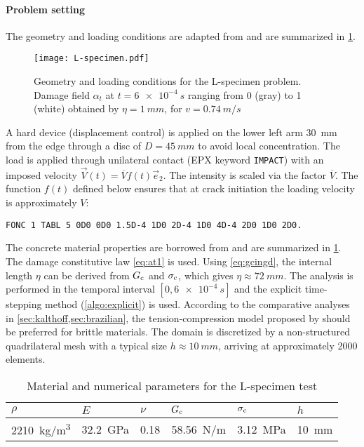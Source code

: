 \paragraph{Problem setting}
The geometry and loading conditions are adapted from \cite{OzboltBedeSharmaMayer:2015} and are summarized in \cref{fig:L-specimen}.
\begin{figure}[htbp]
\centering
\texttt{[image: L-specimen.pdf]}
\caption{Geometry and loading conditions for the L-specimen problem. Damage field $\alpha_t$ at $t=\SI{6e-4}{s}$ ranging from 0 (gray) to 1 (white) obtained by $\eta=\SI{1}{mm}$, for $v=\SI{0.74}{m/s}$} \label{fig:L-specimen}
\end{figure}
A hard device (displacement control) is applied on the lower left arm \SI{30}{mm} from the edge through a disc of $D=\SI{45}{mm}$ to avoid local concentration. The load is applied through unilateral contact (EPX keyword \texttt{IMPACT}) with an imposed velocity $\vec{V}(t)=\overline{V}f(t)\vec{e}_2$. The intensity is scaled via the factor $\overline{V}$. The function $f(t)$ defined below ensures that at crack initiation the loading velocity is approximately $V$:
\begin{lstlisting}
FONC 1 TABL 5 0D0 0D0 1.5D-4 1D0 2D-4 1D0 4D-4 2D0 1D0 2D0.
\end{lstlisting}
The concrete material properties are borrowed from \cite{OzboltBedeSharmaMayer:2015} and are summarized in \cref{tab:L}. The damage constitutive law \eqref{eq:at1} is used. Using \eqref{eq:gcingd}, the internal length $\eta$ can be derived from $G_\mathrm{c}$ and $\sigma_{\mathrm{c}}$, which gives $\eta\approx \SI{72}{mm}$. The analysis is performed in the temporal interval $[0,\SI{6e-4}{s}]$ and the explicit time-stepping method (\cref{algo:explicit}) is used. According to the comparative analyses in \cref{sec:kalthoff,sec:brazilian}, the tension-compression model proposed by \cite{FreddiRoyer-Carfagni:2010} should be preferred for brittle materials. The domain is discretized by a non-structured quadrilateral mesh with a typical size $h\approx\SI{10}{mm}$, arriving at approximately \num{2000} elements. 
\begin{table}[htbp]
\centering
\caption{Material and numerical parameters for the L-specimen test} \label{tab:L}
\begin{tabular}{llllll} \toprule
$\rho$ & $E$ & $\nu$ & $G_\mathrm{c}$ & $\sigma_{\mathrm{c}}$ & $h$ \\ \midrule
\SI{2210}{kg/m^3} & \SI{32.2}{GPa} & 0.18 & \SI{58.56}{N/m} & \SI{3.12}{MPa} & \SI{10}{mm} \\ \bottomrule
\end{tabular}
\end{table}

